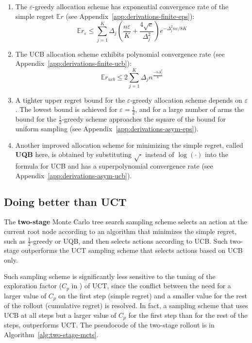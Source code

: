 \documentclass{article}
\newcommand {\IE} {\ensuremath {\mathbb{E}}}
\begin{document}
\begin{enumerate}
\item The $\varepsilon$-greedy allocation scheme has exponential convergence
rate of the simple regret $\IE r$ (see Appendix~\ref{app:derivations-finite-eps}):
\begin{equation}
  \IE r_\varepsilon\le\sum_{j=1}^K\Delta_j\left(\frac {n\varepsilon} K + \frac {4\sqrt e}
{\Delta_j^2}\right)e^{-\Delta_j^2n\varepsilon/8K}
\end{equation}
\item The UCB allocation scheme exhibits polynomial convergence
rate (see Appendix~\ref{app:derivations-finite-ucb}):
\begin{equation}
\IE r_{ucb} \le 2\sum_{j=1}^K \Delta_jn^{\frac {-\alpha \Delta_j^2} 8}
\end{equation}
\item A tighter upper regret bound for the $\varepsilon$-greedy allocation scheme depends on
$\varepsilon$. The lowest bound is
achieved for $\varepsilon=\frac 1
2$, and for a large number of arms the bound for the $\frac 1 2$-greedy scheme approaches the square of the
bound for uniform sampling (see
Appendix~\ref{app:derivations-asym-eps}).

\item Another improved allocation scheme for minimizing the simple regret,
called \textbf{UQB} here, is obtained by substituting $\sqrt{\cdot}$
instead of $\log(\cdot)$ into the formula for UCB and has a
superpolynomial convergence rate (see
Appendix~\ref{app:derivations-asym-ucb}).
\end{enumerate}


\subsection{Doing better than UCT}

The {\bf two-stage} Monte Carlo tree search sampling
scheme selects an action at the current root node according to an
algorithm that minimizes the simple regret, such as $\frac 1 2$-greedy or
UQB, and then selects actions according to UCB. Such two-stage
outperforms the UCT sampling scheme that selects actions based on
UCB only.

Such sampling scheme is significantly less sensitive to the tuning of
the exploration factor ($C_p$ in \cite{Kocsis.uct}) of UCT, since the
conflict \cite{Bubeck.pure} between the need for a larger value of
$C_p$ on the first step (simple regret) and a smaller value for the
rest of the rollout (cumulative regret) is resolved. In fact, a
sampling scheme that uses UCB at all steps but a larger value of $C_p$
for the first step than for the rest of the steps, outperforms
UCT. The pseudocode of the two-stage rollout is in
Algorithm~\ref{alg:two-stage-mcts}.
\end{document}
